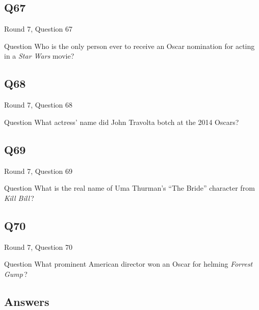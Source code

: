 \documentclass[11pt]{beamer}
\begin{document}
\subsection*{Q67}
\begin{frame}[t]{Round 7, Question 67}
\vspace{2em}
\begin{block}{Question}
Who is the only person ever to receive an Oscar nomination for acting in a \emph{Star Wars} movie?
\end{block}
\end{frame}
    

\subsection*{Q68}
\begin{frame}[t]{Round 7, Question 68}
\vspace{2em}
\begin{block}{Question}
What actress' name did John Travolta botch at the 2014 Oscars?
\end{block}
\end{frame}
    

\subsection*{Q69}
\begin{frame}[t]{Round 7, Question 69}
\vspace{2em}
\begin{block}{Question}
What is the real name of Uma Thurman's ``The Bride'' character from \emph{Kill Bill}\,?
\end{block}
\end{frame}
    

\subsection*{Q70}
\begin{frame}[t]{Round 7, Question 70}
\vspace{2em}
\begin{block}{Question}
What prominent American director won an Oscar for helming \emph{Forrest Gump}\,?
\end{block}
\end{frame}
    
\subsection{Answers}
\end{document}
